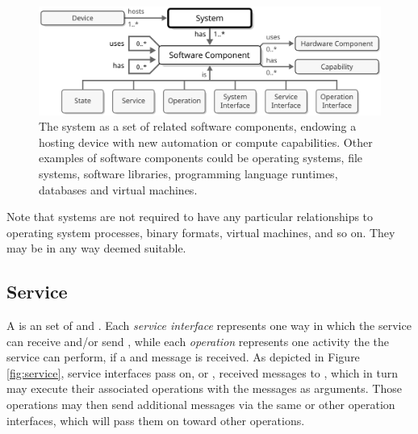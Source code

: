\begin{figure}[ht!]
  \centering
  \includegraphics[scale=0.9]{figures/system}
  \caption{
    The system as a set of related software components, endowing a hosting device with new automation or compute capabilities.
    Other examples of software components could be operating systems, file systems, software libraries, programming language runtimes, databases and virtual machines.
  }
  \label{fig:system}
\end{figure}

Note that systems are not required to have any particular relationships to operating system processes, binary formats, virtual machines, and so on.
They may be  in any way deemed suitable.

\subsection{Service}
\label{sec:concepts:service}

A  is an  set of  and .
Each \textit{service interface} represents one way in which the service can receive and/or send , while each \textit{operation} represents one activity the   the service can perform, if a  and  message is received.
As depicted in Figure \ref{fig:service}, service interfaces pass on, or , received messages to , which in turn may execute their associated operations with the messages as arguments.
Those operations may then send additional messages via the same or other operation interfaces, which will pass them on toward other operations.

